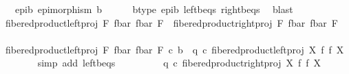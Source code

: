 \begin{isabellebody}
\ \ \ epi{\isacharunderscore}{\kern0pt}b{\isacharcolon}{\kern0pt}\ {\isachardoublequoteopen}epimorphism\ b{\isachardoublequoteclose}\isanewline
\ \ \ \ \isamarkupfalse%
\ b{\isacharunderscore}{\kern0pt}type\ epi{\isacharunderscore}{\kern0pt}b\ left{\isacharunderscore}{\kern0pt}b{\isacharunderscore}{\kern0pt}eqs\ right{\isacharunderscore}{\kern0pt}b{\isacharunderscore}{\kern0pt}eqs\ \isamarkupfalse%
\ blast\isanewline
\ \ \isanewline
\ \isanewline
\ \ \isamarkupfalse%
\ {\isachardoublequoteopen}fibered{\isacharunderscore}{\kern0pt}product{\isacharunderscore}{\kern0pt}left{\isacharunderscore}{\kern0pt}proj\ F\ {\isacharparenleft}{\kern0pt}f{\isacharunderscore}{\kern0pt}bar{\isacharparenright}{\kern0pt}\ {\isacharparenleft}{\kern0pt}f{\isacharunderscore}{\kern0pt}bar{\isacharparenright}{\kern0pt}\ F\ {\isacharequal}{\kern0pt}\ fibered{\isacharunderscore}{\kern0pt}product{\isacharunderscore}{\kern0pt}right{\isacharunderscore}{\kern0pt}proj\ F\ {\isacharparenleft}{\kern0pt}f{\isacharunderscore}{\kern0pt}bar{\isacharparenright}{\kern0pt}\ {\isacharparenleft}{\kern0pt}f{\isacharunderscore}{\kern0pt}bar{\isacharparenright}{\kern0pt}\ F{\isachardoublequoteclose}\isanewline
\ \ \isamarkupfalse%
\ {\isacharminus}{\kern0pt}\ \isanewline
\ \ \ \ \isamarkupfalse%
\ {\isachardoublequoteopen}{\isacharparenleft}{\kern0pt}fibered{\isacharunderscore}{\kern0pt}product{\isacharunderscore}{\kern0pt}left{\isacharunderscore}{\kern0pt}proj\ F\ {\isacharparenleft}{\kern0pt}f{\isacharunderscore}{\kern0pt}bar{\isacharparenright}{\kern0pt}\ {\isacharparenleft}{\kern0pt}f{\isacharunderscore}{\kern0pt}bar{\isacharparenright}{\kern0pt}\ F{\isacharparenright}{\kern0pt}\ {\isasymcirc}\isactrlsub c\ b\ {\isacharequal}{\kern0pt}\ q\ {\isasymcirc}\isactrlsub c\ fibered{\isacharunderscore}{\kern0pt}product{\isacharunderscore}{\kern0pt}left{\isacharunderscore}{\kern0pt}proj\ X\ f\ f\ X{\isachardoublequoteclose}\isanewline
\ \ \ \ \ \ \isamarkupfalse%
\ {\isacharparenleft}{\kern0pt}simp\ add{\isacharcolon}{\kern0pt}\ left{\isacharunderscore}{\kern0pt}b{\isacharunderscore}{\kern0pt}eqs{\isacharparenright}{\kern0pt}\isanewline
\ \ \ \ \isamarkupfalse%
\ \isamarkupfalse%
\ {\isachardoublequoteopen}{\isachardot}{\kern0pt}{\isachardot}{\kern0pt}{\isachardot}{\kern0pt}\ {\isacharequal}{\kern0pt}\ q\ {\isasymcirc}\isactrlsub c\ fibered{\isacharunderscore}{\kern0pt}product{\isacharunderscore}{\kern0pt}right{\isacharunderscore}{\kern0pt}proj\ X\ f\ f\ X{\isachardoublequoteclose}\isanewline

\end{isabellebody}
